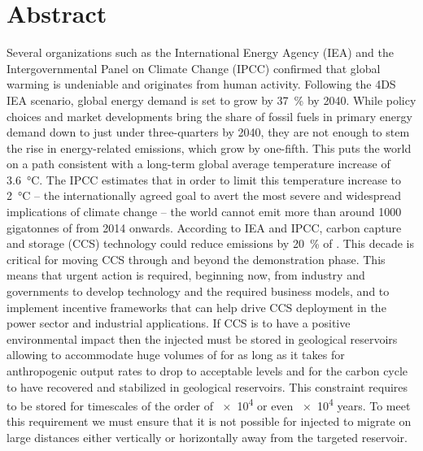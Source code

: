 \chapter*{Abstract}
\setlength{\parindent}{0cm}
\setlength{\parskip}{1em}
Several organizations such as the International Energy Agency (IEA) and the
Intergovernmental Panel on Climate Change (IPCC) confirmed that global warming
is undeniable and originates from human activity.
Following the 4DS IEA scenario, global energy demand is set to grow by
\SI{37}{\percent} by \num{2040}.
While policy choices and market developments bring the share of fossil fuels in
primary energy demand down to just under three-quarters
by 2040, they are not enough to stem the rise in energy-related 
emissions, which grow by one-fifth. This puts the world on a path consistent
with a long-term global average temperature increase of
\SI{3.6}{\degreeCelsius}.
The IPCC estimates that in order to limit this temperature increase to
\SI{2}{\degreeCelsius} – the internationally agreed goal to avert the most
severe and widespread implications of climate change – the world cannot emit
more than around \num{1000} gigatonnes of  from \num{2014} onwards.
According to IEA and IPCC, carbon capture and storage (CCS) technology could
reduce  emissions by \SI{20}{\percent} of .
This decade is critical for moving CCS through and beyond the demonstration
phase. This means that urgent action is required, beginning now, from industry
and governments to develop technology and the required business models, and to
implement
incentive
frameworks that can help drive CCS deployment in the power sector and industrial
applications.
If CCS is to have a positive environmental impact then the injected 
must be stored in geological reservoirs allowing to accommodate huge volumes of
 for as long as it takes for anthropogenic output rates to drop to
acceptable levels and for the carbon cycle to have recovered and stabilized in
geological reservoirs. This constraint requires  to be stored for
timescales of the order of \num{e4} or even \num{e4} years. To meet this
requirement we must ensure that it is not possible for injected  to
migrate on large distances either vertically or horizontally away from the targeted
reservoir. \par

